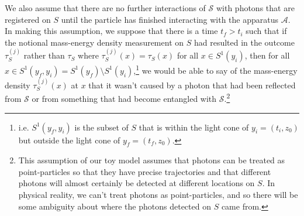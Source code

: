 \documentclass[12pt]{report}
\providecommand{\DIFadd}[1]{{\protect\color{blue}\uwave{#1}}} %
\providecommand{\DIFdel}[1]{{\protect\color{red}\sout{#1}}}                      %
\providecommand{\DIFaddbegin}{} %
\providecommand{\DIFaddend}{} %
\providecommand{\DIFdelbegin}{} %
\providecommand{\DIFdelend}{} %
\begin{document}
We also assume that there are no further interactions of $\mathcal{S}$ with photons that are registered on $S$ until the particle has finished interacting with the apparatus $\mathcal{A}$.  In making this assumption, we suppose that there is a time $t_f>t_i$	%
 such that if the notional mass-energy density measurement on $S$ had resulted in the outcome \DIFdelbegin \DIFdel{$\tau_S^{(j)}$ }\DIFdelend \DIFaddbegin \DIFadd{$\tau_{S,j}$ }\DIFaddend rather than $\tau_S$ where \DIFdelbegin \DIFdel{$\tau_S^{(j)}(x)=\tau_S(x)$ }\DIFdelend \DIFaddbegin \DIFadd{$\tau_{S,j}(x)=\tau_S(x)$ }\DIFaddend for all $x\in S^1(y_i)$, then for all $x \in S^1(y_f,y_i)=S^1(y_f)\setminus S^1(y_i)$,\footnote{i.e. $S^1(y_f,y_i)$ is the subset of $S$ that is within the light cone of $y_i=(t_i, z_0)$ but outside the light cone of $y_f=(t_f, z_0)$.}  %
%
we would be able to say of the mass-energy density \DIFdelbegin \DIFdel{$\tau_S^{(j)}(x)$ }\DIFdelend \DIFaddbegin \DIFadd{$\tau_{S,j}(x)$ }\DIFaddend at $x$ that it wasn't caused by a photon that had been reflected from $\mathcal{S}$ or from something that had become entangled with $\mathcal{S}$.\footnote{This assumption of our toy model assumes that photons can be treated as point-particles so that they have precise trajectories and that different photons will almost certainly be detected at different locations on $S$. In physical reality, we can't treat photons as point-particles, and so there will be some ambiguity about where the photons detected on $S$ came from.}
\end{document}
